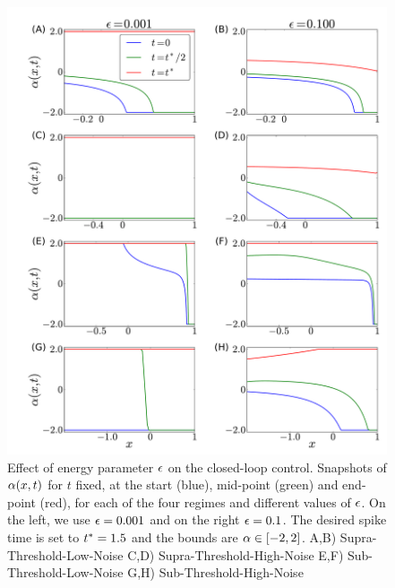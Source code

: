 \documentclass[12pt]{iopart}
\begin{document}
\begin{figure}[htp]
\begin{center}
  \includegraphics[width=\textwidth]{Figs/HJB/Regimes_eps_comparison.pdf}
  \caption[labelInTOC]{Effect of energy parameter ${\epsilon}$ on the closed-loop
  control. Snapshots of ${\alpha}(x,t)$ for $t$ fixed, at the start (blue), mid-point (green) and end-point
  (red), for each of the four regimes and different values of ${\epsilon}$.
  On the left, we use ${\epsilon} = 0.001$ and on the right ${\epsilon} = 0.1$.
  The desired spike time is set to
  ${ t^* }=1.5$ and the bounds are ${\alpha} \in [-2,2]$. 
  A,B)
   Supra-Threshold-Low-Noise 
  C,D) 
   Supra-Threshold-High-Noise 
  E,F)
   Sub-Threshold-Low-Noise 
  G,H)
   Sub-Threshold-High-Noise}
\label{fig:HJB_4regimes_control_different_eps} 
\end{center}
\end{figure}
\end{document}
